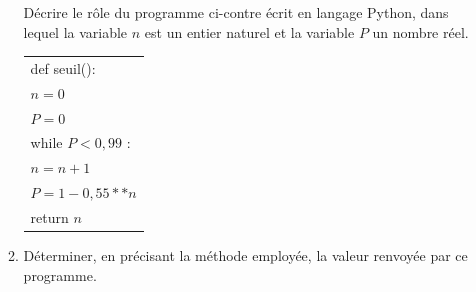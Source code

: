\begin{enumerate}
\begin{enumerate}
\begin{minipage}{6cm}Décrire le rôle du programme ci-contre écrit en langage Python, dans lequel la variable $n$ est un entier naturel et la variable $P$ un nombre réel.
\end{minipage} \hfill \begin{minipage}{6cm}
\begin{tabular}{|l|}\hline
def seuil():\\
\qquad $n=0$\\
\qquad $P=0$\\
\qquad while $P< 0,99$ :\\
\qquad \quad $n = n+1$\\
\qquad \quad $P=1 - 0,55**n$\\
\qquad return $n$\\ \hline
\end{tabular}
\end{minipage}
		\item Déterminer, en précisant la méthode employée, la valeur renvoyée par ce programme.
	\end{enumerate}
\end{enumerate}

\bigskip
